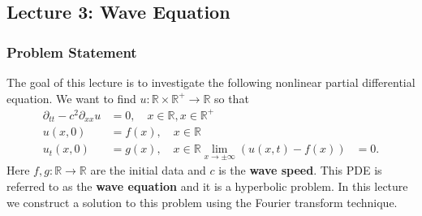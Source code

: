 \documentclass{article}
\theoremstyle{definition}
\theoremstyle{definition}
\newcommand{\R}{\mathbb{R}}
\begin{document}
\subsection{Lecture 3: Wave Equation}
\subsubsection{Problem Statement}
The goal of this lecture is to investigate the following nonlinear partial differential equation. We want to find $u:\R\times \R^+\to \R$ so that
\begin{align*}
    \partial_{tt}-c^2\partial_{xx}u&=0,\quad x\in \R,x\in \R^+ \\
    u(x,0)&=f(x),\quad x\in \R \\
    u_{t}(x,0)&=g(x),\quad x\in \R
    \lim_{x\to \pm \infty}(u(x,t)-f(x))&=0.
\end{align*}
Here $f,g:\R\to \R$ are the initial data and $c$ is the \textbf{wave speed}. This PDE is referred to as the \textbf{wave equation} and it is a hyperbolic problem.
In this lecture we construct a solution to this problem using the Fourier transform
technique.
\end{document}
